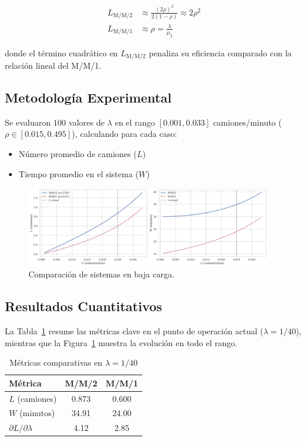 \documentclass[12pt, a4paper]{article}
\begin{document}
    \begin{align}
    	L_{\text{M/M/2}} &\approx \frac{(2\rho)^2}{2(1-\rho)} \approx 2\rho^2 \\
    	L_{\text{M/M/1}} &\approx \rho = \frac{\lambda}{\mu_2}
    \end{align}
    
    donde el término cuadrático en $L_{\text{M/M/2}}$ penaliza su eficiencia comparado con la relación lineal del M/M/1.
    
    \subsection{Metodología Experimental}
    Se evaluaron $100$ valores de $\lambda$ en el rango $[0.001, 0.033]$ camiones/minuto ($\rho \in [0.015, 0.495]$), calculando para cada caso:
    \begin{itemize}
    	\item Número promedio de camiones ($L$)
    	\item Tiempo promedio en el sistema ($W$)
    \end{itemize}
    
    \begin{figure}[H]
    	\centering
    	\includegraphics[width=0.95\textwidth]{figures/hipotesis1_resultados.png}
    	\caption{Comparación de sistemas en baja carga.}
    	\label{fig:hip1-results}
    \end{figure}
    
    \subsection{Resultados Cuantitativos}
    La Tabla~\ref{tab:hip1-metrics} resume las métricas clave en el punto de operación actual ($\lambda = 1/40$), mientras que la Figura~\ref{fig:hip1-results} muestra la evolución en todo el rango.
    
    \begin{table}[H]
    	\centering
    	\caption{Métricas comparativas en $\lambda = 1/40$}
    	\label{tab:hip1-metrics}
    	\begin{tabular}{lcc}
    		\toprule
    		\textbf{Métrica} & \textbf{M/M/2} & \textbf{M/M/1} \\
    		\midrule
    		$L$ (camiones) & 0.873 & 0.600 \\
    		$W$ (minutos) & 34.91 & 24.00 \\
    		$\partial L/\partial \lambda$ & 4.12 & 2.85 \\
    		\bottomrule
    	\end{tabular}
    \end{table}
    
\end{document}
